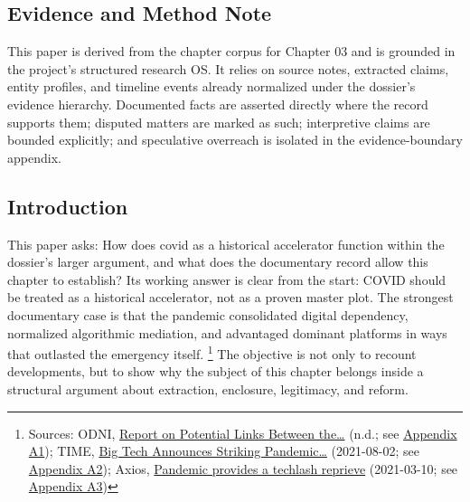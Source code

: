 \documentclass[
  american,
  11pt,
  letterpaper,
]{article}
\begin{document}
\subsection{Evidence and Method Note}\label{evidence-and-method-note-3}

This paper is derived from the chapter corpus for Chapter 03 and is
grounded in the project's structured research OS. It relies on source
notes, extracted claims, entity profiles, and timeline events already
normalized under the dossier's evidence hierarchy. Documented facts are
asserted directly where the record supports them; disputed matters are
marked as such; interpretive claims are bounded explicitly; and
speculative overreach is isolated in the evidence-boundary appendix.

\subsection{Introduction}\label{introduction-3}

This paper asks: How does covid as a historical accelerator function
within the dossier's larger argument, and what does the documentary
record allow this chapter to establish? Its working answer is clear from
the start: COVID should be treated as a historical accelerator, not as a
proven master plot. The strongest documentary case is that the pandemic
consolidated digital dependency, normalized algorithmic mediation, and
advantaged dominant platforms in ways that outlasted the emergency
itself. \footnote{Sources: ODNI,
  \href{https://www.dni.gov/files/ODNI/documents/assessments/Report-on-Potential-Links-Between-the-Wuhan-Institute-of-Virology-and-the-Origins-of-COVID-19-20230623.pdf}{Report
  on Potential Links Between the\ldots{}} (n.d.; see
  \hyperref[ch-03-appendix-a1-report-on-potential-links-between-the-wuhan-institute-of-virology-and-the-origins-of-covid-19]{Appendix
  A1}); TIME,
  \href{https://time.com/6085674/big-tech-apple-microsoft-facebook-amazon-google-earnings/}{Big
  Tech Announces Striking Pandemic\ldots{}} (2021-08-02; see
  \hyperref[ch-03-appendix-a2-big-tech-announces-striking-pandemic-gains-as-small-businesses-strain-to-find-their-footing]{Appendix
  A2}); Axios,
  \href{https://www.axios.com/2021/03/10/pandemic-provides-techlash-reprieve}{Pandemic
  provides a techlash reprieve} (2021-03-10; see
  \hyperref[ch-03-appendix-a3-pandemic-provides-a-techlash-reprieve]{Appendix
  A3})} The objective is not only to recount developments, but to show
why the subject of this chapter belongs inside a structural argument
about extraction, enclosure, legitimacy, and reform.
\end{document}
